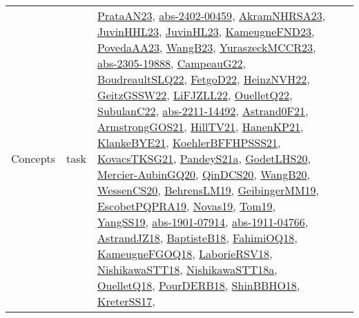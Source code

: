 {\begin{longtable}{lp{3cm}>{\raggedright}p{6cm}>{\raggedright}p{6cm}p{8cm}}
Concepts & task & \href{articles/PrataAN23.pdf}{PrataAN23}\cite{PrataAN23}, \href{articles/abs-2402-00459.pdf}{abs-2402-00459}\cite{abs-2402-00459}, \href{articles/AkramNHRSA23.pdf}{AkramNHRSA23}\cite{AkramNHRSA23}, \href{papers/JuvinHHL23.pdf}{JuvinHHL23}\cite{JuvinHHL23}, \href{papers/JuvinHL23.pdf}{JuvinHL23}\cite{JuvinHL23}, \href{papers/KameugneFND23.pdf}{KameugneFND23}\cite{KameugneFND23}, \href{papers/PovedaAA23.pdf}{PovedaAA23}\cite{PovedaAA23}, \href{papers/WangB23.pdf}{WangB23}\cite{WangB23}, \href{articles/YuraszeckMCCR23.pdf}{YuraszeckMCCR23}\cite{YuraszeckMCCR23}, \href{articles/abs-2305-19888.pdf}{abs-2305-19888}\cite{abs-2305-19888}, \href{articles/CampeauG22.pdf}{CampeauG22}\cite{CampeauG22}, \href{papers/BoudreaultSLQ22.pdf}{BoudreaultSLQ22}\cite{BoudreaultSLQ22}, \href{articles/FetgoD22.pdf}{FetgoD22}\cite{FetgoD22}, \href{articles/HeinzNVH22.pdf}{HeinzNVH22}\cite{HeinzNVH22}, \href{papers/GeitzGSSW22.pdf}{GeitzGSSW22}\cite{GeitzGSSW22}, \href{papers/LiFJZLL22.pdf}{LiFJZLL22}\cite{LiFJZLL22}, \href{papers/OuelletQ22.pdf}{OuelletQ22}\cite{OuelletQ22}, \href{articles/SubulanC22.pdf}{SubulanC22}\cite{SubulanC22}, \href{articles/abs-2211-14492.pdf}{abs-2211-14492}\cite{abs-2211-14492}, \href{papers/Astrand0F21.pdf}{Astrand0F21}\cite{Astrand0F21}, \href{papers/ArmstrongGOS21.pdf}{ArmstrongGOS21}\cite{ArmstrongGOS21}, \href{papers/HillTV21.pdf}{HillTV21}\cite{HillTV21}, \href{papers/HanenKP21.pdf}{HanenKP21}\cite{HanenKP21}, \href{papers/KlankeBYE21.pdf}{KlankeBYE21}\cite{KlankeBYE21}, \href{articles/KoehlerBFFHPSSS21.pdf}{KoehlerBFFHPSSS21}\cite{KoehlerBFFHPSSS21}, \href{papers/KovacsTKSG21.pdf}{KovacsTKSG21}\cite{KovacsTKSG21}, \href{articles/PandeyS21a.pdf}{PandeyS21a}\cite{PandeyS21a}, \href{papers/GodetLHS20.pdf}{GodetLHS20}\cite{GodetLHS20}, \href{papers/Mercier-AubinGQ20.pdf}{Mercier-AubinGQ20}\cite{Mercier-AubinGQ20}, \href{articles/QinDCS20.pdf}{QinDCS20}\cite{QinDCS20}, \href{papers/WangB20.pdf}{WangB20}\cite{WangB20}, \href{papers/WessenCS20.pdf}{WessenCS20}\cite{WessenCS20}, \href{papers/BehrensLM19.pdf}{BehrensLM19}\cite{BehrensLM19}, \href{papers/GeibingerMM19.pdf}{GeibingerMM19}\cite{GeibingerMM19}, \href{articles/EscobetPQPRA19.pdf}{EscobetPQPRA19}\cite{EscobetPQPRA19}, \href{articles/Novas19.pdf}{Novas19}\cite{Novas19}, \href{papers/Tom19.pdf}{Tom19}\cite{Tom19}, \href{papers/YangSS19.pdf}{YangSS19}\cite{YangSS19}, \href{articles/abs-1901-07914.pdf}{abs-1901-07914}\cite{abs-1901-07914}, \href{articles/abs-1911-04766.pdf}{abs-1911-04766}\cite{abs-1911-04766}, \href{papers/AstrandJZ18.pdf}{AstrandJZ18}\cite{AstrandJZ18}, \href{articles/BaptisteB18.pdf}{BaptisteB18}\cite{BaptisteB18}, \href{articles/FahimiOQ18.pdf}{FahimiOQ18}\cite{FahimiOQ18}, \href{papers/KameugneFGOQ18.pdf}{KameugneFGOQ18}\cite{KameugneFGOQ18}, \href{articles/LaborieRSV18.pdf}{LaborieRSV18}\cite{LaborieRSV18}, \href{papers/NishikawaSTT18.pdf}{NishikawaSTT18}\cite{NishikawaSTT18}, \href{papers/NishikawaSTT18a.pdf}{NishikawaSTT18a}\cite{NishikawaSTT18a}, \href{papers/OuelletQ18.pdf}{OuelletQ18}\cite{OuelletQ18}, \href{articles/PourDERB18.pdf}{PourDERB18}\cite{PourDERB18}, \href{articles/ShinBBHO18.pdf}{ShinBBHO18}\cite{ShinBBHO18}, \href{articles/KreterSS17.pdf}{KreterSS17}\cite{KreterSS17}, 
\end{longtable}}
